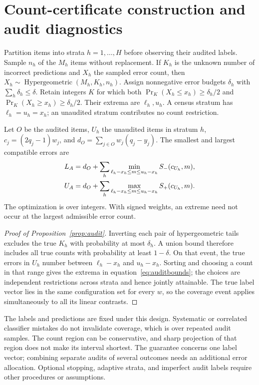 \section{Count-certificate construction and audit diagnostics}\label{app:audit}
Partition items into strata $h=1,\ldots,H$ before observing their audited
labels. Sample $n_h$ of the $M_h$ items without replacement. If $K_h$ is the
unknown number of incorrect predictions and $X_h$ the sampled error count,
then $X_h\sim\operatorname{Hypergeometric}(M_h,K_h,n_h)$. Assign nonnegative
error budgets $\delta_h$ with $\sum_h\delta_h\leq\delta$. Retain integers $K$
for which both $\Pr_K(X_h\leq x_h)\geq\delta_h/2$ and
$\Pr_K(X_h\geq x_h)\geq\delta_h/2$. Their extrema are $\ell_h,u_h$.
A census stratum has $\ell_h=u_h=x_h$; an unaudited stratum contributes no
count restriction.

Let $O$ be the audited items, $U_h$ the unaudited items in stratum $h$,
$c_j=(2q_j-1)w_j$, and $d_O=\sum_{j\in O}w_j(q_j-y_j)$. The smallest and
largest compatible errors are
\begin{align}
 L_A&=d_O+\sum_h\min_{\ell_h-x_h\leq m\leq u_h-x_h}
                 S_-(c_{U_h},m),\notag\\
 U_A&=d_O+\sum_h\max_{\ell_h-x_h\leq m\leq u_h-x_h}
                 S_+(c_{U_h},m).\label{eq:auditbounds}
\end{align}
The optimization is over integers. With signed weights, an extreme need not
occur at the largest admissible error count.

\begin{proof}[Proof of Proposition~\ref{prop:audit}]
Inverting each pair of hypergeometric tails excludes the true $K_h$ with
probability at most $\delta_h$. A union bound therefore includes all true
counts with probability at least $1-\delta$. On that event, the true errors in
$U_h$ number between $\ell_h-x_h$ and $u_h-x_h$. Sorting and choosing a count
in that range gives the extrema in equation~\eqref{eq:auditbounds}; the choices
are independent restrictions across strata and hence jointly attainable.
The true label vector lies in the same configuration set for every $w$, so the
coverage event applies simultaneously to all its linear contrasts.
\end{proof}
The labels and predictions are fixed under this design. Systematic or
correlated classifier mistakes do not invalidate coverage, which is over
repeated audit samples. The count region can be conservative, and sharp
projection of that region does not make its interval shortest. The guarantee
concerns one label vector; combining separate audits of several outcomes needs
an additional error allocation. Optional stopping, adaptive strata, and
imperfect audit labels require other procedures or assumptions.

